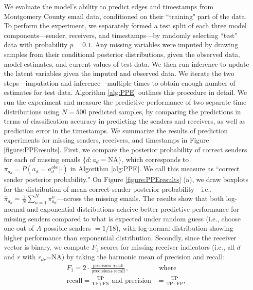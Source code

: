 \documentclass[ba]{imsart}
\numberwithin{equation}{section}
\theoremstyle{plain}
\begin{document}
	We evaluate the model's ability to predict edges and timestamps from Montgomery County email data, conditioned on their ``training" part of the data. To perform the experiment, we separately formed a test split of each three model components---sender, receivers, and timestamps---by randomly selecting ``test" data with probability $p=0.1$. Any missing variables were imputed by drawing samples from their conditional posterior distributions, given the observed data, model estimates, and current values of test data. We then run inference to update the latent variables given the imputed and observed data. We iterate the two steps---imputation and inference---multiple times to obtain enough number of estimates for test data. Algorithm \ref{alg:PPE} outlines this procedure in detail. We run the experiment and measure the predictive performance of two separate time distributions using $N=500$ predicted samples, by comparing the predictions in terms of classification accuracy in predicting the senders and receivers, as well as prediction error in the timestamps. We summarize the results of prediction experiments for missing senders, receivers, and timestamps in Figure \ref{figure:PPEresults}. First, we compare the posterior probability of correct senders for each of missing emails $\{d:a_d=\mbox{NA}\}$, which corresponds to $\pi_{a_{d}}=P(a_{d} = a^{obs}_{d}|\cdot)$ in Algorithm \ref{alg:PPE}. We call this measure as ``correct sender posterior probability." On Figure \ref{figure:PPEresults} (a), we draw boxplots for the distribution of mean correct sender posterior probability---i.e., $\hat{\pi}_{a_{d}} = \frac{1}{N}\sum_{n=1}^N \pi^n_{a_{d}}$---across the missing emails. The results show that both log-normal and exponential distributions acheive better predictive performance for missing senders compared to what is expected under random guess (i.e., choose one out of $A$ possible senders $=1/18$), with log-normal distribution showing higher performance than exponential distribution. Secondly, since the receiver vector is binary, we compute $F_1$ scores for missing receiver indicators (i.e., all $d$ and $r$ with $r_{dr}$=NA) by taking the harmonic mean of precision and recall:
	\begin{equation}
	\begin{aligned}
	F_1 =2\cdot\frac{\mbox{precision}\cdot \mbox{recall}}{\mbox{precision}+ \mbox{recall}}, &\mbox{ where } \\
			\mbox{recall}  = \frac{\mbox{TP}}{\mbox{TP+FN}} \mbox{ and } \mbox{precision} & =\frac{\mbox{TP}}{\mbox{TP+FP}},
			\end{aligned}
	\end{equation}
\end{document}

